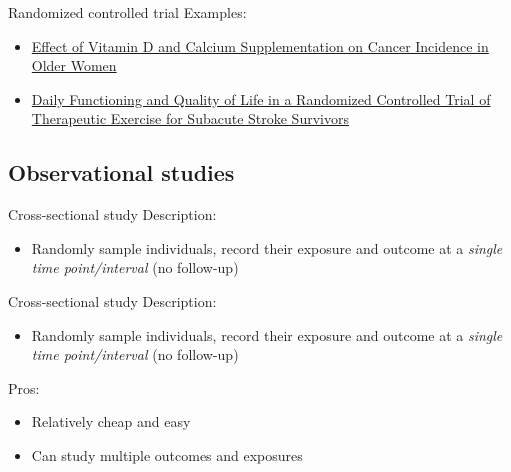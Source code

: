 \documentclass[10pt,t]{beamer}
\begin{document}
\begin{frame}[c]{Randomized controlled trial}
Examples: 

\vspace{0.3cm}

\begin{itemize}
	\item \href{https://jamanetwork.com/journals/jama/article-abstract/2613159}{\color{cyan} Effect of Vitamin D and Calcium Supplementation on Cancer Incidence in Older Women}
	\item \href{http://stroke.ahajournals.org/content/36/8/1764.short}{\color{cyan} Daily Functioning and Quality of Life in a Randomized Controlled Trial of Therapeutic Exercise for Subacute Stroke Survivors}
\end{itemize}

\end{frame}


\subsection{Observational studies}

\begin{frame}{Cross-sectional study}
Description:
\begin{itemize}
	\item Randomly sample individuals, record their exposure and outcome at a \textit{single time point/interval} (no follow-up)
\end{itemize}
\end{frame}

\begin{frame}{Cross-sectional study}
Description:
\begin{itemize}
	\item Randomly sample individuals, record their exposure and outcome at a \textit{single time point/interval} (no follow-up)
\end{itemize}
Pros:
\begin{itemize}
	\item Relatively cheap and easy
	\item Can study multiple outcomes and exposures
\end{itemize}
\end{frame}
\end{document}
